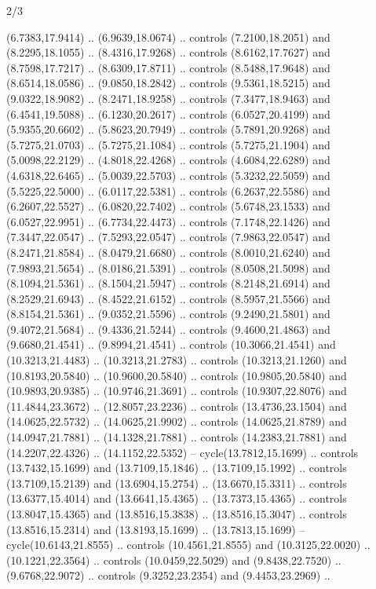 \begin{flagdescription}{2/3}
\begin{scope}[yshift=\flagwidth,scale=\flagwidth/1241.93737]
\begin{scope}[y=-1mm, x=1mm,draw=gold,fill=blue,line join=miter,miter limit=4,line width=1.8\lw]
{  (6.7383,17.9414) .. (6.9639,18.0674) .. controls (7.2100,18.2051) and
  (8.2295,18.1055) .. (8.4316,17.9268) .. controls (8.6162,17.7627) and
  (8.7598,17.7217) .. (8.6309,17.8711) .. controls (8.5488,17.9648) and
  (8.6514,18.0586) .. (9.0850,18.2842) .. controls (9.5361,18.5215) and
  (9.0322,18.9082) .. (8.2471,18.9258) .. controls (7.3477,18.9463) and
  (6.4541,19.5088) .. (6.1230,20.2617) .. controls (6.0527,20.4199) and
  (5.9355,20.6602) .. (5.8623,20.7949) .. controls (5.7891,20.9268) and
  (5.7275,21.0703) .. (5.7275,21.1084) .. controls (5.7275,21.1904) and
  (5.0098,22.2129) .. (4.8018,22.4268) .. controls (4.6084,22.6289) and
  (4.6318,22.6465) .. (5.0039,22.5703) .. controls (5.3232,22.5059) and
  (5.5225,22.5000) .. (6.0117,22.5381) .. controls (6.2637,22.5586) and
  (6.2607,22.5527) .. (6.0820,22.7402) .. controls (5.6748,23.1533) and
  (6.0527,22.9951) .. (6.7734,22.4473) .. controls (7.1748,22.1426) and
  (7.3447,22.0547) .. (7.5293,22.0547) .. controls (7.9863,22.0547) and
  (8.2471,21.8584) .. (8.0479,21.6680) .. controls (8.0010,21.6240) and
  (7.9893,21.5654) .. (8.0186,21.5391) .. controls (8.0508,21.5098) and
  (8.1094,21.5361) .. (8.1504,21.5947) .. controls (8.2148,21.6914) and
  (8.2529,21.6943) .. (8.4522,21.6152) .. controls (8.5957,21.5566) and
  (8.8154,21.5361) .. (9.0352,21.5596) .. controls (9.2490,21.5801) and
  (9.4072,21.5684) .. (9.4336,21.5244) .. controls (9.4600,21.4863) and
  (9.6680,21.4541) .. (9.8994,21.4541) .. controls (10.3066,21.4541) and
  (10.3213,21.4483) .. (10.3213,21.2783) .. controls (10.3213,21.1260) and
  (10.8193,20.5840) .. (10.9600,20.5840) .. controls (10.9805,20.5840) and
  (10.9893,20.9385) .. (10.9746,21.3691) .. controls (10.9307,22.8076) and
  (11.4844,23.3672) .. (12.8057,23.2236) .. controls (13.4736,23.1504) and
  (14.0625,22.5732) .. (14.0625,21.9902) .. controls (14.0625,21.8789) and
  (14.0947,21.7881) .. (14.1328,21.7881) .. controls (14.2383,21.7881) and
  (14.2207,22.4326) .. (14.1152,22.5352) -- cycle(13.7812,15.1699) .. controls
  (13.7432,15.1699) and (13.7109,15.1846) .. (13.7109,15.1992) .. controls
  (13.7109,15.2139) and (13.6904,15.2754) .. (13.6670,15.3311) .. controls
  (13.6377,15.4014) and (13.6641,15.4365) .. (13.7373,15.4365) .. controls
  (13.8047,15.4365) and (13.8516,15.3838) .. (13.8516,15.3047) .. controls
  (13.8516,15.2314) and (13.8193,15.1699) .. (13.7813,15.1699) --
  cycle(10.6143,21.8555) .. controls (10.4561,21.8555) and (10.3125,22.0020) ..
  (10.1221,22.3564) .. controls (10.0459,22.5029) and (9.8438,22.7520) ..
  (9.6768,22.9072) .. controls (9.3252,23.2354) and (9.4453,23.2969) ..
}
\end{scope}
\end{scope}
\end{flagdescription}

